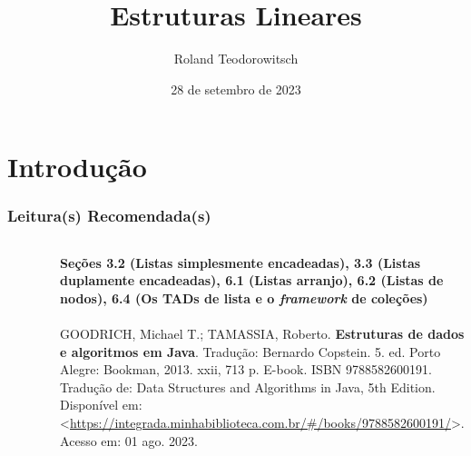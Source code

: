 \documentclass[aspectratio=169]{beamer}
\title[\sc{Estruturas Lineares}]{Estruturas Lineares}
\author[Roland Teodorowitsch]{Roland Teodorowitsch}
\institute[ALEST I - EP - PUCRS]{Algoritmos e Estruturas de Dados I - Escola Politécnica - PUCRS}
\date{28 de setembro de 2023}
\begin{document}
\justifying

\begin{frame}
	\titlepage
\end{frame}

\section{Introdução}

\begin{frame}\frametitle{Leitura(s) Recomendada(s)}

\begin{columns}[T]
\begin{column}{0.15\linewidth}
\vspace{-3mm}
\begin{figure}[h]
	\centering
	\includegraphics[height=0.3\paperheight]{imagens/livro_goodrich.jpg}
\end{figure}
\end{column}
\begin{column}{0.85\linewidth}
\tiny{\textbf{Seções 3.2 (Listas simplesmente encadeadas), 3.3 (Listas duplamente encadeadas), 6.1 (Listas arranjo), 6.2 (Listas de nodos), 6.4 (Os TADs de lista e o \emph{framework} de coleções)}\\
~}\\
\scriptsize{GOODRICH, Michael T.; TAMASSIA, Roberto. \textbf{Estruturas de dados e algoritmos em Java}. Tradução: Bernardo Copstein. 5. ed. Porto Alegre: Bookman, 2013. xxii, 713 p. E-book. ISBN 9788582600191. Tradução de: Data Structures and Algorithms in Java, 5th Edition. Disponível em: \textless{}\url{https://integrada.minhabiblioteca.com.br/\#/books/9788582600191/}\textgreater{}. Acesso em: 01 ago. 2023.}
\end{column}
\end{columns}

\end{frame}
\end{document}
